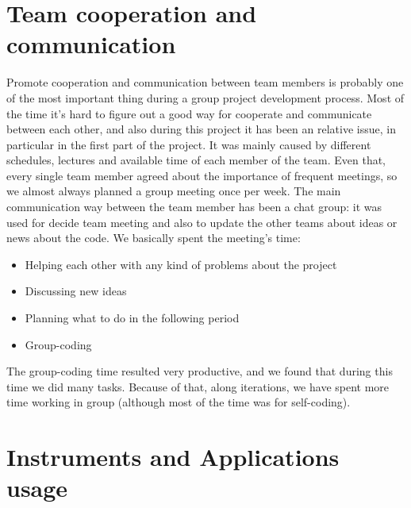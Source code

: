 \section{Team cooperation and communication}
\vspace{-5mm}
Promote cooperation and communication between team members is probably one of the most important thing during a group project development process. Most of the time it's hard to figure out a good way for cooperate and communicate between each other, and also during this project it has been an relative issue, in particular in the first part of the project. It was mainly caused by different schedules, lectures and available time of each member of the team.
Even that, every single team member agreed about the importance of frequent meetings, so we almost always planned a group meeting once per week. 
The main communication way between the team member has been a chat group: it was used for decide team meeting and also to update the other teams about ideas or news about the code.
We basically spent the meeting's time:
\vspace{-5mm}
\begin{itemize}
 \setlength{\itemsep}{-5pt}
 \item Helping each other with any kind of problems about the project
 \item Discussing new ideas 
 \item Planning what to do in the following period
 \item Group-coding 
\end{itemize} 
\vspace{-5mm}
The group-coding time resulted very productive, and we found that during this time we did many tasks. Because of that, along iterations, we have spent more time working in group (although most of the time was for self-coding).
\section{Instruments and Applications usage}
\vspace{-5mm}
